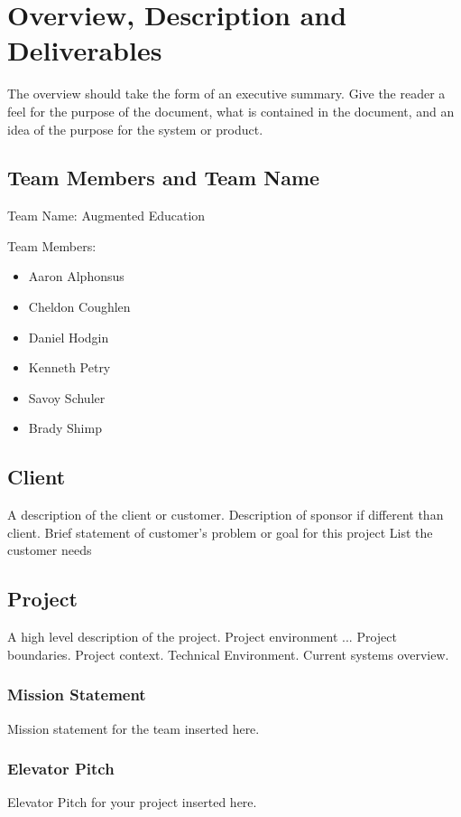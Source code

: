 

\chapter{Overview, Description and Deliverables}

The overview should take the form of an executive summary.  Give the reader a feel 
for the purpose of the document, what is contained in the document, and an idea 
of the purpose for the system or product. 

\section{Team Members and Team Name}

Team Name: Augmented Education

\noindent Team Members:
\begin{itemize}
	\item Aaron Alphonsus
	\item Cheldon Coughlen
	\item Daniel Hodgin
	\item Kenneth Petry
	\item Savoy Schuler
	\item Brady Shimp
\end{itemize}

\section{Client}
A description of the client or customer.
Description of sponsor if different than client.
Brief statement of customer's problem or goal for this project
List the customer needs

\section{Project}
A high level description of the project.  Project environment ...
Project boundaries.
Project context.
Technical Environment.
Current systems overview.


\subsection{Mission Statement}
Mission statement for the team inserted here.   

\subsection{Elevator Pitch}
Elevator Pitch for your project inserted here.   

